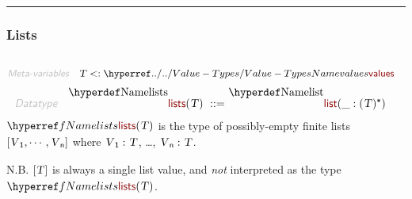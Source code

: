 

\begin{center}
\rule{3in}{0.4pt}
\end{center}

\subsubsection{Lists}\hypertarget{lists}{}\label{lists}

\begin{align*}
  [ \
  \KEY{Datatype} \quad & \NAMEREF{lists} \\
  \KEY{Funcon} \quad & \NAMEREF{list} \\
  \KEY{Funcon} \quad & \NAMEREF{list-elements} \\
  \KEY{Funcon} \quad & \NAMEREF{list-nil} \\
  \KEY{Alias} \quad & \NAMEREF{nil} \\
  \KEY{Funcon} \quad & \NAMEREF{list-cons} \\
  \KEY{Alias} \quad & \NAMEREF{cons} \\
  \KEY{Funcon} \quad & \NAMEREF{list-head} \\
  \KEY{Alias} \quad & \NAMEREF{head} \\
  \KEY{Funcon} \quad & \NAMEREF{list-tail} \\
  \KEY{Alias} \quad & \NAMEREF{tail} \\
  \KEY{Funcon} \quad & \NAMEREF{list-length} \\
  \KEY{Funcon} \quad & \NAMEREF{list-append}
  \ ]
\end{align*}
\begin{align*}
  \KEY{Meta-variables} \quad
  & \VAR{T} <: \NAMEHYPER{../..}{Value-Types}{values}
\end{align*}
\begin{align*}
  \KEY{Datatype} \quad 
  \NAMEDECL{lists}(
                     \VAR{T} ) 
  \ ::= \ & \NAMEDECL{list}(
                               \_ : (  \VAR{T} )\STAR)
\end{align*}
$\SHADE{\NAMEREF{lists}
           (  \VAR{T} )}$ is the type of possibly-empty finite lists $\SHADE{[  \VAR{V}\SUB{1}, 
                \cdots, 
                \VAR{V}\SUB{n} ]}$ 
  where $\SHADE{\VAR{V}\SUB{1} : \VAR{T}}$, \ldots{}, $\SHADE{\VAR{V}\SUB{n} : \VAR{T}}$.

N.B. $\SHADE{[  \VAR{T} ]}$ is always a single list value, and \emph{not} interpreted as the
  type $\SHADE{\NAMEREF{lists}
           (  \VAR{T} )}$.


